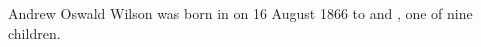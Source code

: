 
Andrew Oswald Wilson was born in  on 16 August 1866\cite{AOWisonBio,Argus1866Aug28}
to  and , one of nine children.
